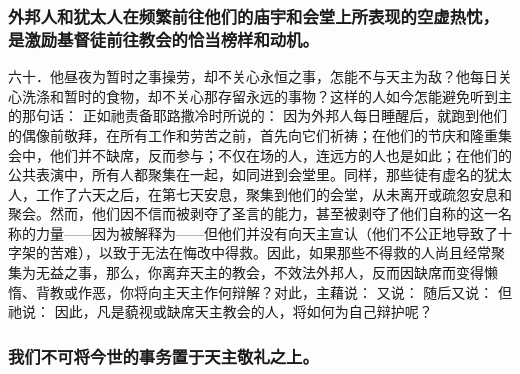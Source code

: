 
\subsubsection{外邦人和犹太人在频繁前往他们的庙宇和会堂上所表现的空虚热忱，是激励基督徒前往教会的恰当榜样和动机。}

六十．他昼夜为暂时之事操劳，却不关心永恒之事，怎能不与天主为敌？他每日关心洗涤和暂时的食物，却不关心那存留永远的事物？这样的人如今怎能避免听到主的那句话： 正如祂责备耶路撒冷时所说的： 因为外邦人每日睡醒后，就跑到他们的偶像前敬拜，在所有工作和劳苦之前，首先向它们祈祷；在他们的节庆和隆重集会中，他们并不缺席，反而参与；不仅在场的人，连远方的人也是如此；在他们的公共表演中，所有人都聚集在一起，如同进到会堂里。同样，那些徒有虚名的犹太人，工作了六天之后，在第七天安息，聚集到他们的会堂，从未离开或疏忽安息和聚会。然而，他们因不信而被剥夺了圣言的能力，甚至被剥夺了他们自称的这一名称的力量——因为被解释为——但他们并没有向天主宣认（他们不公正地导致了十字架的苦难），以致于无法在悔改中得救。因此，如果那些不得救的人尚且经常聚集为无益之事，那么，你离弃天主的教会，不效法外邦人，反而因缺席而变得懒惰、背教或作恶，你将向主天主作何辩解？对此，主藉说： 又说： 随后又说： 但祂说： 因此，凡是藐视或缺席天主教会的人，将如何为自己辩护呢？\par


\subsubsection{我们不可将今世的事务置于天主敬礼之上。}

